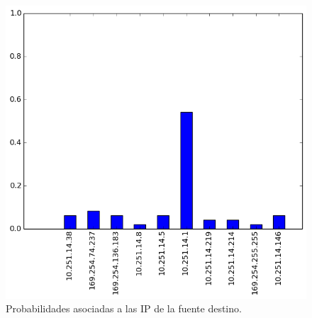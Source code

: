 \begin{figure}[h!]
  \centering
	\includegraphics[scale=0.66]{../experimentacion-svilerino/starbucks/full-experiment-1/histogram_dst_probabilities.png}
  \caption{Probabilidades asociadas a las IP de la fuente destino.}
\end{figure}


